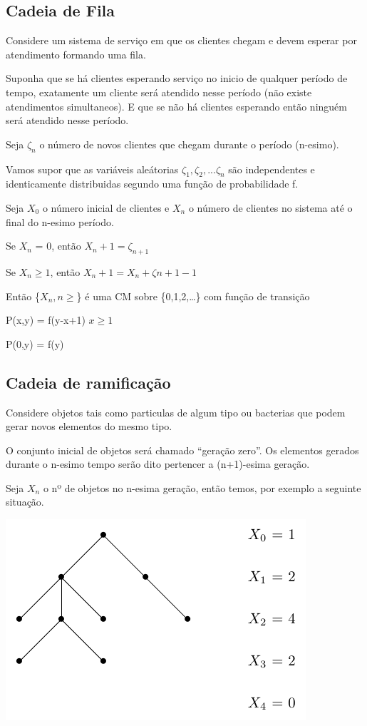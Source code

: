\documentclass[]{article}
\theoremstyle{definition}
\theoremstyle{definition}
\theoremstyle{definition}
\theoremstyle{remark}
\begin{document}
\subsection{Cadeia de Fila}\label{cadeia-de-fila}

Considere um sistema de serviço em que os clientes chegam e devem
esperar por atendimento formando uma fila.

Suponha que se há clientes esperando serviço no inicio de qualquer
período de tempo, exatamente um cliente será atendido nesse período (não
existe atendimentos simultaneos). E que se não há clientes esperando
então ninguém será atendido nesse período.

Seja \(\zeta_n\) o número de novos clientes que chegam durante o período
(n-esimo).

Vamos supor que as variáveis aleátorias \(\zeta_1, \zeta_2,... \zeta_n\)
são independentes e identicamente distribuidas segundo uma função de
probabilidade f.

Seja \(X_0\) o número inicial de clientes e \(X_n\) o número de clientes
no sistema até o final do n-esimo período.

Se \(X_n\) = 0, então \(X_n + 1 = \zeta_{n + 1}\)

Se \(X_n \geq 1\), então \(X_n + 1 = X_n + \zeta{n+1} - 1\)

Então \{\(X_n, n \geq\)\} é uma CM sobre \{0,1,2,\ldots{}\} com função
de transição

P(x,y) = f(y-x+1) \(x \geq 1\)

P(0,y) = f(y)

\subsection{Cadeia de ramificação}\label{cadeia-de-ramificacao}

Considere objetos tais como particulas de algum tipo ou bacterias que
podem gerar novos elementos do mesmo tipo.

O conjunto inicial de objetos será chamado ``geração zero''. Os
elementos gerados durante o n-esimo tempo serão dito pertencer a
(n+1)-esima geração.

Seja \(X_n\) o nº de objetos no n-esima geração, então temos, por
exemplo a seguinte situação.

\begin{center}\includegraphics{./figuras/pe4} \end{center}
\end{document}
